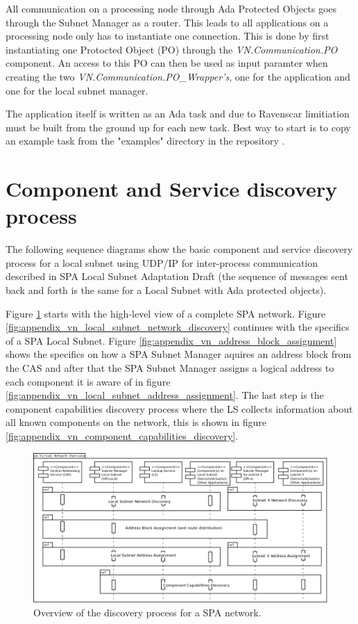 All communication on a processing node through Ada Protected Objects goes
through the Subnet Manager as a router. This leads to all applications on
a processing node only has to instantiate one connection. This is done by first
instantiating one Protocted Object (PO) through the \emph{VN.Communication.PO}
component. An access to this PO can then be used as input paramter when
creating the two \emph{VN.Communication.PO\_Wrapper's}, one for the application
and one for the local subnet manager.

The application itself is written as an Ada task and due to Ravenscar
limitiation must be built from the ground up for each new task. Best way to
start is to copy an example task from the "examples" directory in the
repository \cite{web:github-vn-lib}.

\section{Component and Service discovery process}\label{sec:discovery_process}
The following sequence diagrams show the basic component and service discovery
process for a local subnet using UDP/IP for inter-process communication
described in SPA Local Subnet Adaptation Draft \cite{spa:local-subnet} (the
sequence of messages sent back and forth is the same for a Local Subnet with
Ada protected objects).

Figure
\ref{fig:appendix_vn_discovery_overview} starts with the high-level view of a
complete SPA network. Figure
\ref{fig:appendix_vn_local_subnet_network_discovery} continues with the
specifics of a SPA Local Subnet. Figure
\ref{fig:appendix_vn_address_block_assignment} shows the specifics on how a SPA
Subnet Manager aquires an address block from the CAS and after that the SPA
Subnet Manager assigns a logical address to each component it is aware of in
figure \ref{fig:appendix_vn_local_subnet_address_assignment}. The last step is the
component capabilities discovery process where the LS collects
information about all known components on the network, this is shown in figure
\ref{fig:appendix_vn_component_capabilities_discovery}.

\begin{figure}[h]
    \centering
    \includegraphics[width=\textwidth]{figures/vn_discovery_overview}
    \caption{Overview of the discovery process for a SPA network.}
    \label{fig:appendix_vn_discovery_overview}
\end{figure}

